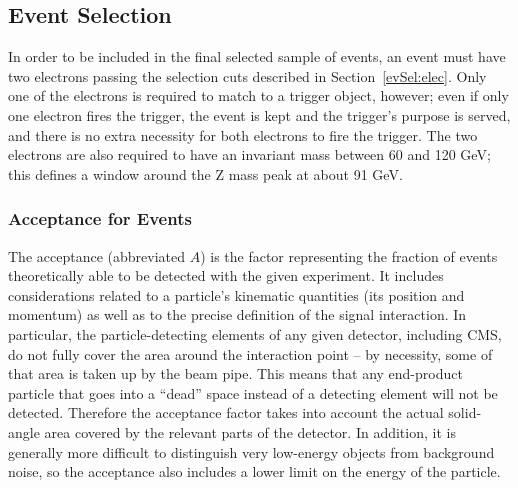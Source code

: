 \subsection{\Zee Event Selection}
\label{evSel:zee}

In order to be included in the final selected sample of \Zee events, 
an event must have two electrons passing the selection cuts 
described in Section~\ref{evSel:elec}.  
Only one of the electrons is required to match to a trigger object, however; 
even if only one electron fires the trigger, 
the event is kept and the trigger's purpose is served, 
and there is no extra necessity for both electrons to fire the trigger.  
The two electrons are also required to have an invariant mass 
between 60 and 120 GeV; 
this defines a window around the Z mass peak at about 91 GeV.  

\subsubsection{Acceptance for \Zee Events}
\label{evSel:acc}


The acceptance (abbreviated $A$) 
is the factor representing the fraction of events 
theoretically able to be detected with the given experiment.  
It includes considerations related to a particle's kinematic quantities 
(its position and momentum)
as well as to the precise definition of the signal interaction.  
In particular, the particle-detecting elements of any given 
detector, including CMS, do not fully cover the area around 
the interaction point -- 
by necessity, some of that area is taken up by the beam pipe.  
This means that any end-product particle that goes into a 
``dead'' space instead of a detecting element will not be 
detected.  
Therefore the acceptance factor takes into account the 
actual solid-angle area covered by the relevant parts of the detector.  
In addition, it is generally more difficult to distinguish 
very low-energy objects from background noise, 
so the acceptance also includes a lower limit on the 
energy of the particle.  

